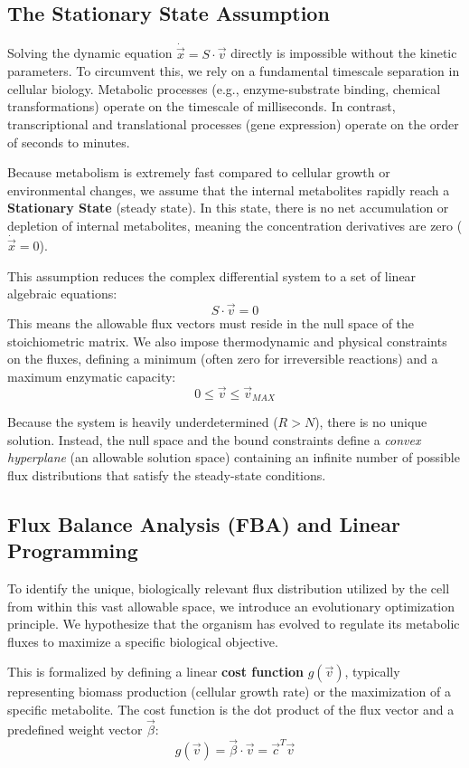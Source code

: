 \subsection{The Stationary State Assumption}
\label{subsec:stationary_state}

Solving the dynamic equation \(\dot{\vec{x}} = S \cdot \vec{v}\) directly is impossible without the kinetic parameters. To circumvent this, we rely on a fundamental timescale separation in cellular biology. Metabolic processes (e.g., enzyme-substrate binding, chemical transformations) operate on the timescale of milliseconds. In contrast, transcriptional and translational processes (gene expression) operate on the order of seconds to minutes.

Because metabolism is extremely fast compared to cellular growth or environmental changes, we assume that the internal metabolites rapidly reach a \textbf{Stationary State} (steady state). In this state, there is no net accumulation or depletion of internal metabolites, meaning the concentration derivatives are zero (\(\dot{\vec{x}} = 0\)).

This assumption reduces the complex differential system to a set of linear algebraic equations:
\[
    S \cdot \vec{v} = 0
\]
This means the allowable flux vectors must reside in the null space of the stoichiometric matrix. We also impose thermodynamic and physical constraints on the fluxes, defining a minimum (often zero for irreversible reactions) and a maximum enzymatic capacity:
\[
    0 \leq \vec{v} \leq \vec{v}_{MAX}
\]

Because the system is heavily underdetermined (\(R > N\)), there is no unique solution. Instead, the null space and the bound constraints define a \textit{convex hyperplane} (an allowable solution space) containing an infinite number of possible flux distributions that satisfy the steady-state conditions.

\subsection{Flux Balance Analysis (FBA) and Linear Programming}
\label{subsec:fba}

To identify the unique, biologically relevant flux distribution utilized by the cell from within this vast allowable space, we introduce an evolutionary optimization principle. We hypothesize that the organism has evolved to regulate its metabolic fluxes to maximize a specific biological objective.

This is formalized by defining a linear \textbf{cost function} \(g(\vec{v})\), typically representing biomass production (cellular growth rate) or the maximization of a specific metabolite. The cost function is the dot product of the flux vector and a predefined weight vector \(\vec{\beta}\):
\[
    g(\vec{v}) = \vec{\beta} \cdot \vec{v} = \vec{c}^T \vec{v}
\]

